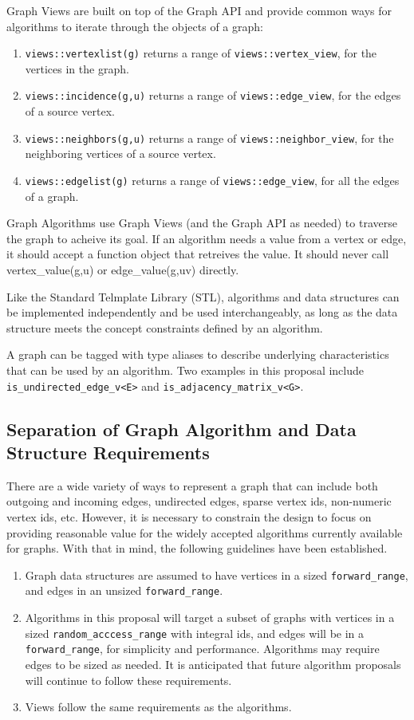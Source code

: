 \documentclass[10pt,onecolumn]{article}
\begin{document}
Graph Views are built on top of the Graph API and provide common ways for algorithms to iterate through the objects of a graph:
\begin{enumerate}
\item \texttt{views::vertexlist(g)} returns a range of \texttt{views::vertex\_view}, for the vertices in the graph. 
\item \texttt{views::incidence(g,u)} returns a range of \texttt{views::edge\_view}, for the edges of a source vertex.
\item \texttt{views::neighbors(g,u)} returns a range of \texttt{views::neighbor\_view}, for the neighboring vertices of a source vertex.
\item \texttt{views::edgelist(g)} returns a range of \texttt{views::edge\_view}, for all the edges of a graph. 
\end{enumerate}

Graph Algorithms use Graph Views (and the Graph API as needed) to traverse the graph to acheive its goal. If an algorithm needs a value from 
a vertex or edge, it should accept a function object that retreives the value. It should never call vertex\_value(g,u) or edge\_value(g,uv)
directly.

Like the Standard Telmplate Library (STL), algorithms and data structures can be implemented independently and be used interchangeably,
as long as the data structure meets the concept constraints defined by an algorithm.

A graph can be tagged with type aliases to describe underlying characteristics that can be used by an algorithm. Two examples
in this proposal include \texttt{is\_undirected\_edge\_v<E>} and \texttt{is\_adjacency\_matrix\_v<G>}.

\subsection{Separation of Graph Algorithm and Data Structure Requirements}

There are a wide variety of ways to represent a graph that can include both outgoing and incoming edges, undirected edges,
sparse vertex ids, non-numeric vertex ids, etc. However, it is necessary to constrain the design to focus on providing reasonable 
value for the widely accepted algorithms currently available for graphs. With that in mind, the following guidelines have been established.
\begin{enumerate}
\item Graph data structures are assumed to have vertices in a sized \texttt{forward\_range}, and edges in an unsized \texttt{forward\_range}.
\item Algorithms in this proposal will target a subset of graphs with vertices in a sized \texttt{random\_acccess\_range} with 
integral ids, and edges will be in a \texttt{forward\_range}, for simplicity and performance. Algorithms may require edges to be sized as
needed. It is anticipated that future algorithm proposals will continue to follow these requirements.
\item Views follow the same requirements as the algorithms.
\end{enumerate}
\end{document}
